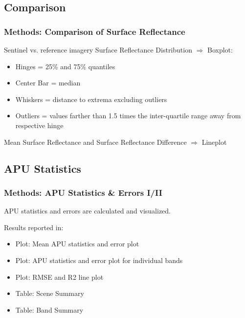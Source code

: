 \documentclass[9pt]{beamer}
\begin{document}
\subsection{Comparison}
\begin{frame}
\frametitle{Methods: Comparison of Surface Reflectance}
Sentinel vs. reference imagery\newline\newline
Surface Reflectance Distribution $\Rightarrow$ Boxplot:
\begin{itemize}
\item Hinges = 25\% and 75\% quantiles
\item Center Bar = median
\item Whiskers = distance to extrema excluding outliers
\item Outliers = values farther than 1.5 times the inter-quartile range away from respective hinge\newline 
\end{itemize}
Mean Surface Reflectance and Surface Reflectance Difference $\Rightarrow$ Lineplot
\end{frame}

\subsection{APU Statistics}
\begin{frame}
\frametitle{Methods: APU Statistics \& Errors I/II}
 APU statistics and errors are calculated and visualized.
\begin{table}[ht]
\centering
{}
\end{table}%
\begin{scriptsize}
Results reported in:
\begin{itemize}
\item Plot: Mean APU statistics and error plot
\item Plot: APU statistics and error plot for individual bands
\item Plot: RMSE and R2 line plot
\item Table: Scene Summary
\item Table: Band Summary 
\end{itemize}
\end{scriptsize}
\end{frame}
\end{document}
